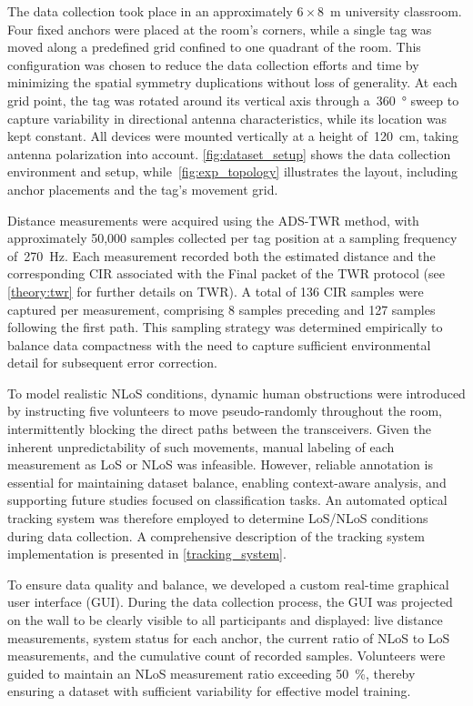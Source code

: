 The data collection took place in an approximately $6 \times 8$~\si{\meter} university classroom. Four fixed anchors were placed at the room's corners, while a single tag was moved along a predefined grid confined to one quadrant of the room. This configuration was chosen to reduce the data collection efforts and time by minimizing the spatial symmetry duplications without loss of generality. At each grid point, the tag was rotated around its vertical axis through a~\SI{360}{\degree} sweep to capture variability in directional antenna characteristics, while its location was kept constant. All devices were mounted vertically at a height of~\SI{120}{\centi\metre}, taking antenna polarization into account. \autoref{fig:dataset_setup} shows the data collection environment and setup, while~\autoref{fig:exp_topology} illustrates the layout, including anchor placements and the tag’s movement grid.

Distance measurements were acquired using the ADS-TWR method, with approximately 50,000 samples collected per tag position at a sampling frequency of~\SI{270}{\hertz}. Each measurement recorded both the estimated distance and the corresponding CIR associated with the Final packet of the TWR protocol (see \autoref{theory:twr} for further details on TWR). A total of 136 CIR samples were captured per measurement, comprising 8 samples preceding and 127 samples following the first path. This sampling strategy was determined empirically to balance data compactness with the need to capture sufficient environmental detail for subsequent error correction.

To model realistic NLoS conditions, dynamic human obstructions were introduced by instructing five volunteers to move pseudo-randomly throughout the room, intermittently blocking the direct paths between the transceivers. Given the inherent unpredictability of such movements, manual labeling of each measurement as LoS or NLoS was infeasible. However, reliable annotation is essential for maintaining dataset balance, enabling context-aware analysis, and supporting future studies focused on classification tasks. An automated optical tracking system was therefore employed to determine LoS/NLoS conditions during data collection. A comprehensive description of the tracking system implementation is presented in \autoref{tracking_system}.

To ensure data quality and balance, we developed a custom real-time graphical user interface (GUI). During the data collection process, the GUI was projected on the wall to be clearly visible to all participants and displayed: live distance measurements, system status for each anchor, the current ratio of NLoS to LoS measurements, and the cumulative count of recorded samples. Volunteers were guided to maintain an NLoS measurement ratio exceeding \SI{50}{\percent}, thereby ensuring a dataset with sufficient variability for effective model training.

